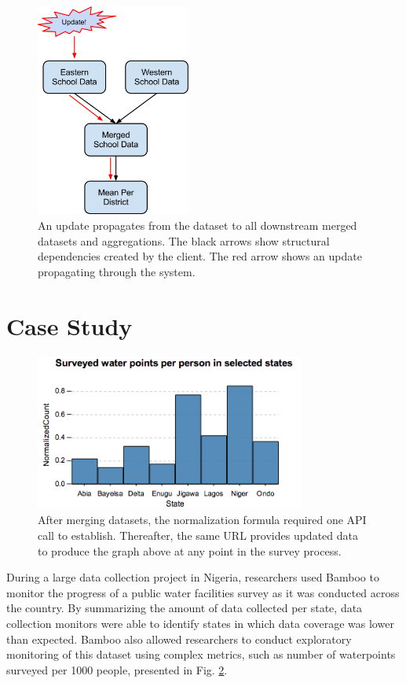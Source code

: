 \documentclass{acm_proc_article-sp}
\begin{document}
\begin{figure}
\centering
\includegraphics[width=2in]{figures/update_flow}
\caption{An update propagates from the dataset to all downstream merged datasets and aggregations.  The black arrows show structural dependencies created by the client.  The red arrow shows an update propagating through the system.}
\label{fig:updates}
\end{figure}

\section{Case Study}

\begin{figure}
\centering
\includegraphics[width=3.5in]{figures/summary.png}
\caption{After merging datasets, the normalization formula required one API call to establish. Thereafter, the same URL provides updated data to produce the graph above at any point in the survey process.}
\label{fig:summary}
\end{figure}

During a large data collection project in Nigeria, researchers used Bamboo to monitor the progress of a public water facilities survey as it was conducted across the country. By summarizing the amount of data collected per state, data collection monitors were able to identify states in which data coverage was lower than expected.
Bamboo also allowed researchers to conduct exploratory monitoring of this
dataset using complex metrics, such as number of waterpoints surveyed per 1000
people, presented in Fig. \ref{fig:summary}.
\end{document}
